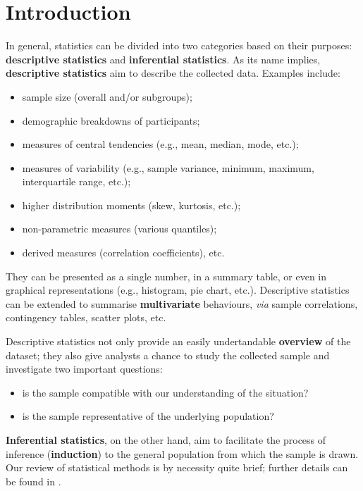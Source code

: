 \section{Introduction}

In general, statistics can be divided into two categories based on their purposes: \textbf{descriptive statistics} and \textbf{inferential statistics}. \newl As its name implies, \textbf{descriptive statistics} aim to describe the collected data. Examples include:
\begin{itemize}[noitemsep]
\item sample size (overall and/or subgroups);
\item demographic breakdowns of participants;
\item measures of central tendencies (e.g., mean, median, mode, etc.);
\item measures of variability (e.g., sample variance, minimum, maximum, interquartile range, etc.);
\item higher distribution moments (skew, kurtosis, etc.);
\item non-parametric measures (various quantiles);
\item derived measures (correlation coefficients), etc.\end{itemize}
They can be presented as a single number, in a summary table, or even in graphical representations (e.g., histogram, pie chart, etc.). Descriptive statistics can be extended to summarise \textbf{multivariate} behaviours, \textit{via} sample correlations, contingency tables, scatter plots, etc. \par
Descriptive statistics not only provide an easily undertandable \textbf{overview} of the dataset; they also give analysts a chance to study the collected sample and investigate two important questions: \begin{itemize}[noitemsep]
\item is the sample compatible with our understanding of the situation?
\item is the sample representative of the underlying population?
\end{itemize}
\textbf{Inferential statistics}, on the other hand, aim to facilitate the process of inference (\textbf{induction}) to the general population from which the sample is drawn.
\newl Our review of statistical methods is by necessity quite brief; further details can be found in \cite{SA_SA,SA_KNNL,SA_HW,SA_BB,SA_SS,SA_R,SA_Re}.  


